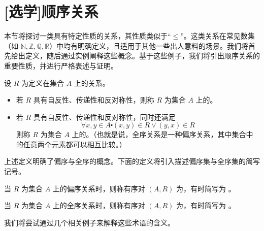 \section[顺序关系]{[选学]顺序关系}\label{sec:section6.3}

本节将探讨一类具有特定性质的关系，其性质类似于``$\le$''。这类关系在常见数集（如 $\mathbb{N}, \mathbb{Z}, \mathbb{Q}, \mathbb{R}$）中均有明确定义，且适用于其他一些出人意料的场景。我们将首先给出定义，随后通过实例阐释这些概念。基于这些例子，我们将引出顺序关系的重要性质，并进行严格表述与证明。

\begin{definition}
    设 $R$ 为定义在集合 $A$ 上的关系。

    \begin{itemize}
        \item 若 $R$ 具有自反性、传递性和反对称性，则称 $R$ 为集合 $A$ 上的。
        \item 若 $R$ 具有自反性、传递性和反对称性，同时还满足
        \[\forall x, y \in A \centerdot (x, y) \in R \lor (y, x) \in R\]
        则称 $R$ 为集合 $A$ 上的。（也就是说，全序关系是一种偏序关系，其中集合中的任意两个元素都可以相互比较。）
    \end{itemize}
\end{definition}

上述定义明确了偏序与全序的概念。下面的定义将引入描述偏序集与全序集的简写记号。

\begin{definition}
    当 $R$ 为集合 $A$ 上的偏序关系时，则称有序对 $(A, R)$ 为，有时简写为 。

    当 $R$ 为集合 $A$ 上的全序关系时，则称有序对 $(A, R)$ 为，有时简写为 。
\end{definition}

我们将尝试通过几个相关例子来解释这些术语的含义。

